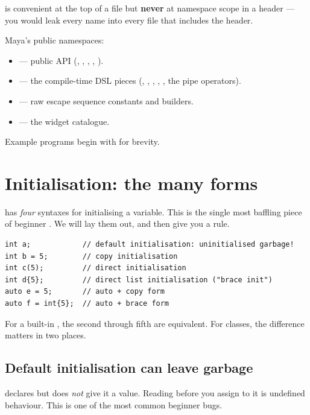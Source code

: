  is convenient at the top of a 
file but \textbf{never} at namespace scope in a header --- you would
leak every name into every file that includes the header.

Maya's public namespaces:

\begin{itemize}[leftmargin=*]
  \item {} --- public API (, ,
    , , ).
  \item {} --- the compile-time DSL pieces
    (, , , ,
    , the pipe operators).
  \item {} --- raw escape sequence constants and
    builders.
  \item {} --- the widget catalogue.
\end{itemize}

Example programs begin with  for brevity.

\section{Initialisation: the many forms}
\label{sec:cpp:init}

\cpp{} has \emph{four} syntaxes for initialising a variable. This is
the single most baffling piece of beginner \cpp{}. We will lay them
out, and then give you a rule.

\begin{lstlisting}
int a;            // default initialisation: uninitialised garbage!
int b = 5;        // copy initialisation
int c(5);         // direct initialisation
int d{5};         // direct list initialisation ("brace init")
auto e = 5;       // auto + copy form
auto f = int{5};  // auto + brace form
\end{lstlisting}

For a built-in , the second through fifth are equivalent.
For classes, the difference matters in two places.

\subsection{Default initialisation can leave garbage}

 declares  but does \emph{not} give it a value.
Reading  before you assign to it is undefined behaviour.
This is one of the most common beginner bugs.

